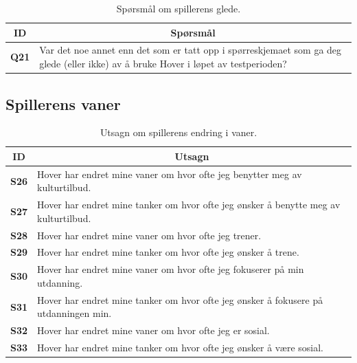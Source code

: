 \begin{table}[H]
    \centering
    \begin{tabularx}{\textwidth}{|c|X|}
        \hline
        \textbf{ID} & \multicolumn{1}{c|}{\textbf{Spørsmål}} \\ \hline
        \textbf{Q21} & Var det noe annet enn det som er tatt opp i spørreskjemaet som ga deg glede (eller ikke) av å bruke Hover i løpet av testperioden? \\ \hline
    \end{tabularx}
    \caption{Spørsmål om spillerens glede.}
    \label{tab:appendix_no_player_enjoyment_questions}
\end{table}

\subsection*{Spillerens vaner}
\begin{table}[H]
    \centering
    \begin{tabularx}{\textwidth}{|c|X|}
        \hline
        \textbf{ID} & \multicolumn{1}{c|}{\textbf{Utsagn}} \\ \hline
        \textbf{S26} & Hover har endret mine vaner om hvor ofte jeg benytter meg av kulturtilbud. \\ 
        \textbf{S27} & Hover har endret mine tanker om hvor ofte jeg ønsker å benytte meg av kulturtilbud.  \\ 
        \textbf{S28} & Hover har endret mine vaner om hvor ofte jeg trener.  \\ 
        \textbf{S29} & Hover har endret mine tanker om hvor ofte jeg ønsker å trene.  \\ 
        \textbf{S30} & Hover har endret mine vaner om hvor ofte jeg fokuserer på min utdanning.  \\ 
        \textbf{S31} & Hover har endret mine tanker om hvor ofte jeg ønsker å fokusere på utdanningen min.  \\ 
        \textbf{S32} & Hover har endret mine vaner om hvor ofte jeg er sosial.  \\ 
        \textbf{S33} & Hover har endret mine tanker om hvor ofte jeg ønsker å være sosial.  \\ \hline
    \end{tabularx}
    \caption{Utsagn om spillerens endring i vaner.}
    \label{tab:appendix_no_player_habits_statements}
\end{table}


